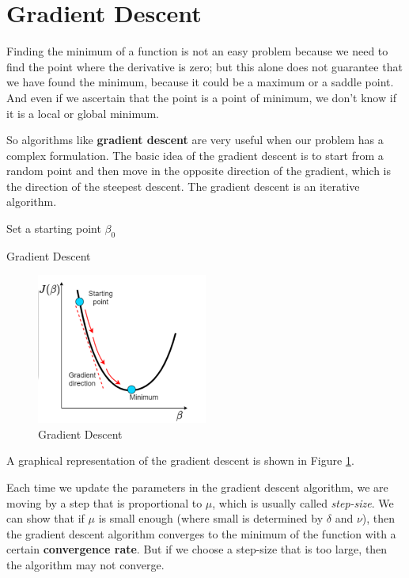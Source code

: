 \section{Gradient Descent}
Finding the minimum of a function is not an easy problem because we need to find the point where the derivative is zero; but this alone does not guarantee that we have found the minimum, because it could be a maximum or a saddle point. And even if we ascertain that the point is a point of minimum, we don't know if it is a local or global minimum.

So algorithms like \textbf{gradient descent} are very useful when our problem has a complex formulation.
The basic idea of the gradient descent is to start from a random point and then move in the opposite direction of the gradient, which is the direction of the steepest descent. The gradient descent is an iterative algorithm.

\begin{algorithm}[H]
    \SetAlgoLined
    Set a starting point $\beta_0$ \\
    \caption{Gradient Descent}
\end{algorithm}

\begin{figure}
    \centering
    \includegraphics[width=0.5\textwidth]{./figures/chapter_6/graphicgradientdescent.png}
    \caption{Gradient Descent}
    \label{fig:gradient_descent}
\end{figure}

A graphical representation of the gradient descent is shown in Figure \ref{fig:gradient_descent}.

Each time we update the parameters in the gradient descent algorithm, we are moving by a step that is proportional to $\mu$, which is usually called \textit{step-size}. We can show that if $\mu$ is small enough (where small is determined by $\delta$ and $\nu$), then the gradient descent algorithm converges to the minimum of the function with a certain \textbf{convergence rate}. 
But if we choose a step-size that is too large, then the algorithm may not converge.

